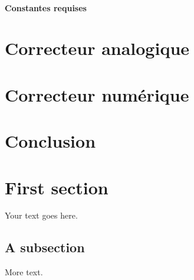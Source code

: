 \documentclass[11pt, french]{article} %
\begin{document}
\paragraph{Constantes requises}

\section{Correcteur analogique}

\section{Correcteur numérique}
\section{Conclusion}

\section{First section}

Your text goes here.



\subsection{A subsection}

More text.
\end{document}
